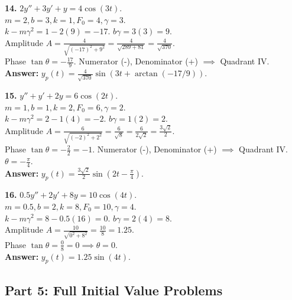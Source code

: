 \documentclass[11pt]{article}
\begin{document}
\vspace{0.5cm}
\textbf{14.} $2y'' + 3y' + y = 4 \cos(3t)$. \\
$m=2, b=3, k=1, F_0=4, \gamma=3$. \\
$k - m\gamma^2 = 1 - 2(9) = -17$. $b\gamma = 3(3) = 9$. \\
Amplitude $A = \frac{4}{\sqrt{(-17)^2 + 9^2}} = \frac{4}{\sqrt{289 + 81}} = \frac{4}{\sqrt{370}}$. \\
Phase $\tan \theta = -\frac{17}{9}$. Numerator (-), Denominator (+) $\implies$ Quadrant IV. \\
\textbf{Answer:} $y_p(t) = \frac{4}{\sqrt{370}} \sin(3t + \arctan(-17/9))$.

\vspace{0.5cm}
\textbf{15.} $y'' + y' + 2y = 6 \cos(2t)$. \\
$m=1, b=1, k=2, F_0=6, \gamma=2$. \\
$k - m\gamma^2 = 2 - 1(4) = -2$. $b\gamma = 1(2) = 2$. \\
Amplitude $A = \frac{6}{\sqrt{(-2)^2 + 2^2}} = \frac{6}{\sqrt{8}} = \frac{6}{2\sqrt{2}} = \frac{3\sqrt{2}}{2}$. \\
Phase $\tan \theta = -\frac{2}{2} = -1$. Numerator (-), Denominator (+) $\implies$ Quadrant IV. $\theta = -\frac{\pi}{4}$. \\
\textbf{Answer:} $y_p(t) = \frac{3\sqrt{2}}{2} \sin(2t - \frac{\pi}{4})$.

\vspace{0.5cm}
\textbf{16.} $0.5y'' + 2y' + 8y = 10 \cos(4t)$. \\
$m=0.5, b=2, k=8, F_0=10, \gamma=4$. \\
$k - m\gamma^2 = 8 - 0.5(16) = 0$. $b\gamma = 2(4) = 8$. \\
Amplitude $A = \frac{10}{\sqrt{0^2 + 8^2}} = \frac{10}{8} = 1.25$. \\
Phase $\tan \theta = \frac{0}{8} = 0 \implies \theta = 0$. \\
\textbf{Answer:} $y_p(t) = 1.25 \sin(4t)$.

\subsection*{Part 5: Full Initial Value Problems}
\end{document}
